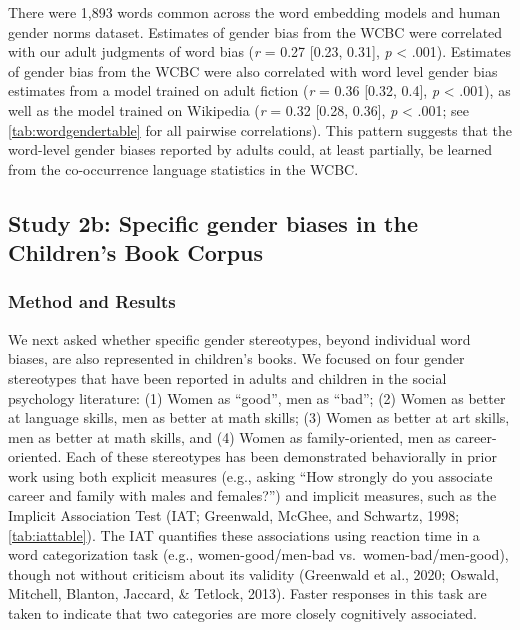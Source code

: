 \documentclass[
  english,
  ,man,floatsintext]{apa6}
\begin{document}
There were 1,893 words common across the word embedding models and human gender norms dataset. Estimates of gender bias from the WCBC were correlated with our adult judgments of word bias (\emph{r} = 0.27 {[}0.23, 0.31{]}, \emph{p} \textless{} .001). Estimates of gender bias from the WCBC were also correlated with word level gender bias estimates from a model trained on adult fiction (\emph{r} = 0.36 {[}0.32, 0.4{]}, \emph{p} \textless{} .001), as well as the model trained on Wikipedia (\emph{r} = 0.32 {[}0.28, 0.36{]}, \emph{p} \textless{} .001; see \autoref{tab:wordgendertable} for all pairwise correlations). This pattern suggests that the word-level gender biases reported by adults could, at least partially, be learned from the co-occurrence language statistics in the WCBC.

\hypertarget{study-2b-specific-gender-biases-in-the-childrens-book-corpus}{%
\subsection{Study 2b: Specific gender biases in the Children's Book Corpus}\label{study-2b-specific-gender-biases-in-the-childrens-book-corpus}}

\hypertarget{method-and-results-2}{%
\subsubsection{Method and Results}\label{method-and-results-2}}

We next asked whether specific gender stereotypes, beyond individual word biases, are also represented in children's books. We focused on four gender stereotypes that have been reported in adults and children in the social psychology literature: (1) Women as \enquote{good}, men as \enquote{bad}; (2) Women as better at language skills, men as better at math skills; (3) Women as better at art skills, men as better at math skills, and (4) Women as family-oriented, men as career-oriented. Each of these stereotypes has been demonstrated behaviorally in prior work using both explicit measures (e.g., asking \enquote{How strongly do you associate career and family with males and females?}) and implicit measures, such as the Implicit Association Test (IAT; Greenwald, McGhee, and Schwartz, 1998; \autoref{tab:iattable}). The IAT quantifies these associations using reaction time in a word categorization task (e.g., women-good/men-bad vs.~women-bad/men-good), though not without criticism about its validity (Greenwald et al., 2020; Oswald, Mitchell, Blanton, Jaccard, \& Tetlock, 2013). Faster responses in this task are taken to indicate that two categories are more closely cognitively associated.
\end{document}
